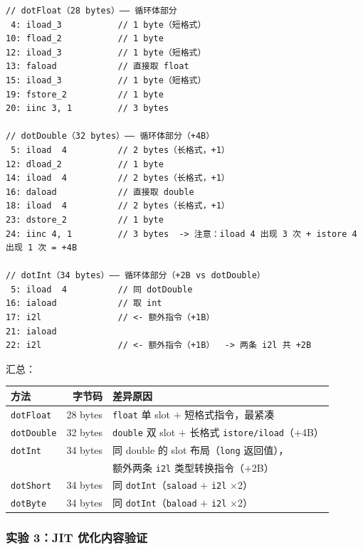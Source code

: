 \documentclass[12pt,a4paper]{article}
\begin{document}
\begin{lstlisting}
// dotFloat（28 bytes）—— 循环体部分
 4: iload_3           // 1 byte（短格式）
10: fload_2           // 1 byte
12: iload_3           // 1 byte（短格式）
13: faload            // 直接取 float
15: iload_3           // 1 byte（短格式）
19: fstore_2          // 1 byte
20: iinc 3, 1         // 3 bytes

// dotDouble（32 bytes）—— 循环体部分（+4B）
 5: iload  4          // 2 bytes（长格式，+1）
12: dload_2           // 1 byte
14: iload  4          // 2 bytes（长格式，+1）
16: daload            // 直接取 double
18: iload  4          // 2 bytes（长格式，+1）
23: dstore_2          // 1 byte
24: iinc 4, 1         // 3 bytes  -> 注意：iload 4 出现 3 次 + istore 4 出现 1 次 = +4B

// dotInt（34 bytes）—— 循环体部分（+2B vs dotDouble）
 5: iload  4          // 同 dotDouble
16: iaload            // 取 int
17: i2l               // <- 额外指令（+1B）
21: iaload
22: i2l               // <- 额外指令（+1B）  -> 两条 i2l 共 +2B
\end{lstlisting}

汇总：

\begin{table}[H]
\centering
\begin{tabular}{l r l}
\toprule
方法 & 字节码 & 差异原因 \\
\midrule
\texttt{dotFloat}  & 28 bytes & \texttt{float} 单 slot $+$ 短格式指令，最紧凑 \\
\texttt{dotDouble} & 32 bytes & \texttt{double} 双 slot $+$ 长格式 \texttt{istore/iload}（+4B） \\
\texttt{dotInt}    & 34 bytes & 同 double 的 slot 布局（\texttt{long} 返回值），\\
                   &          & 额外两条 \texttt{i2l} 类型转换指令（+2B） \\
\texttt{dotShort}  & 34 bytes & 同 \texttt{dotInt}（\texttt{saload} $+$ \texttt{i2l} $\times$2） \\
\texttt{dotByte}   & 34 bytes & 同 \texttt{dotInt}（\texttt{baload} $+$ \texttt{i2l} $\times$2） \\
\bottomrule
\end{tabular}
\end{table}

\subsubsection{实验 3：JIT 优化内容验证}
\end{document}
